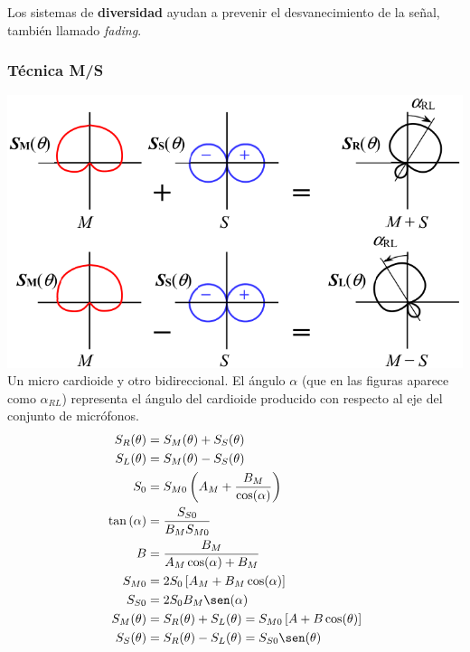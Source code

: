 \documentclass[a4paper, 8pt]{extarticle}
\renewcommand{\sin}{\sen}
\begin{document}
\begin{multicols}{3}
  Los sistemas de \textbf{diversidad} ayudan a prevenir el desvanecimiento de la señal, también llamado \textit{fading}.
  \vspace*{\fill}


  \subsubsection{Técnica M/S}

  \includegraphics[width=0.8\linewidth]{Micros MS.png}
  Un micro cardioide y otro bidireccional. El ángulo $\alpha $ (que en las figuras aparece como $\alpha _{RL}$) representa el ángulo del cardioide producido con respecto al eje del conjunto de micrófonos.
  \begin{align*}
    S_R (\theta )               & = S_M (\theta ) + S_S (\theta )                                                \\
    S_L (\theta )               & = S_M (\theta ) - S_S (\theta )                                                \\
    S_0                         & = S_{M0} \left( A_M + \frac{B_M}{\cos (\alpha )} \right)                       \\
    \tan \left( \alpha  \right) & = \frac{S_{S0}}{B_M S_{M0}}                                                    \\
    B                           & = \frac{B_M}{A_M \cos (\alpha ) + B_M}                                         \\
    S_{M0}                      & = 2 S_0 \left[A_M + B_M \cos (\alpha ) \right]                                 \\
    S_{S0}                      & = 2 S_0 B_M \sin (\alpha )                                                     \\
    S_M ( \theta )              & = S_R ( \theta ) + S_L ( \theta ) = S_{M0} \left[ A + B \cos (\theta ) \right] \\
    S_S ( \theta )              & = S_R ( \theta ) - S_L ( \theta ) = S_{S0} \sen (\theta )
  \end{align*}


\end{multicols}
\end{document}
